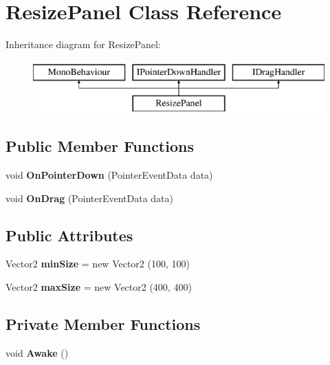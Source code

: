 \hypertarget{class_resize_panel}{}\section{Resize\+Panel Class Reference}
\label{class_resize_panel}
Inheritance diagram for Resize\+Panel\+:\begin{figure}[H]
\begin{center}
\leavevmode
\includegraphics[height=2.000000cm]{class_resize_panel}
\end{center}
\end{figure}
\subsection*{Public Member Functions}
\begin{DoxyCompactItemize}
\item 
\mbox{\label{class_resize_panel_a24a8cc735bde9b13c46f87cec694b4c1}} 
void {\bfseries On\+Pointer\+Down} (Pointer\+Event\+Data data)
\item 
\mbox{\label{class_resize_panel_a3030b47ad87b7995676e6264a2ff78d3}} 
void {\bfseries On\+Drag} (Pointer\+Event\+Data data)
\end{DoxyCompactItemize}
\subsection*{Public Attributes}
\begin{DoxyCompactItemize}
\item 
\mbox{\label{class_resize_panel_a0b09d3047c7e7752a4bad6faee6992b3}} 
Vector2 {\bfseries min\+Size} = new Vector2 (100, 100)
\item 
\mbox{\label{class_resize_panel_afc14450ff5a4c0effb5b8d535c759b5c}} 
Vector2 {\bfseries max\+Size} = new Vector2 (400, 400)
\end{DoxyCompactItemize}
\subsection*{Private Member Functions}
\begin{DoxyCompactItemize}
\item 
\mbox{\label{class_resize_panel_a513c2cf3f2d4c36571c30b1349b12fc5}} 
void {\bfseries Awake} ()
\end{DoxyCompactItemize}
